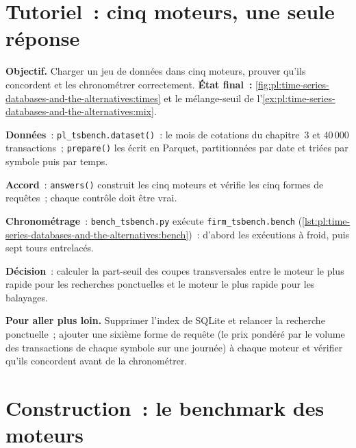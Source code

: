 \section{Tutoriel~: cinq moteurs, une seule réponse}\label{tut:pl:time-series-databases-and-the-alternatives:tut}

\begin{tutorial}
\textbf{Objectif.} Charger un jeu de données dans cinq moteurs, prouver qu'ils concordent et les chronométrer correctement. \textbf{État final~:}
\cref{fig:pl:time-series-databases-and-the-alternatives:times} et le mélange-seuil de
l'\cref{ex:pl:time-series-databases-and-the-alternatives:mix}.
\begin{tutsteps}
\item \textbf{Données}~: \texttt{pl\_tsbench.dataset()}~: le mois de cotations du chapitre~3 et 40\,000 transactions~; \texttt{prepare()} les écrit
en Parquet, partitionnées par date et triées par symbole puis par temps.
\item \textbf{Accord}~: \texttt{answers()} construit les cinq moteurs et vérifie les cinq formes de requêtes~; chaque contrôle doit être vrai.
\item \textbf{Chronométrage}~: \texttt{bench\_tsbench.py} exécute \texttt{firm\_tsbench.bench}
(\cref{lst:pl:time-series-databases-and-the-alternatives:bench})~: d'abord les exécutions à froid, puis sept tours entrelacés.
\item \textbf{Décision}~: calculer la part-seuil des coupes transversales entre le moteur le plus rapide pour les recherches ponctuelles et le moteur le plus
rapide pour les balayages.
\end{tutsteps}
\textbf{Pour aller plus loin.} Supprimer l'index de SQLite et relancer la recherche ponctuelle~; ajouter une sixième forme de requête (le prix
pondéré par le volume des transactions de chaque symbole sur une journée) à chaque moteur et vérifier qu'ils concordent avant de la chronométrer.
\end{tutorial}

\section{Construction~: le benchmark des moteurs}\label{bld:pl:time-series-databases-and-the-alternatives:tsbench}

